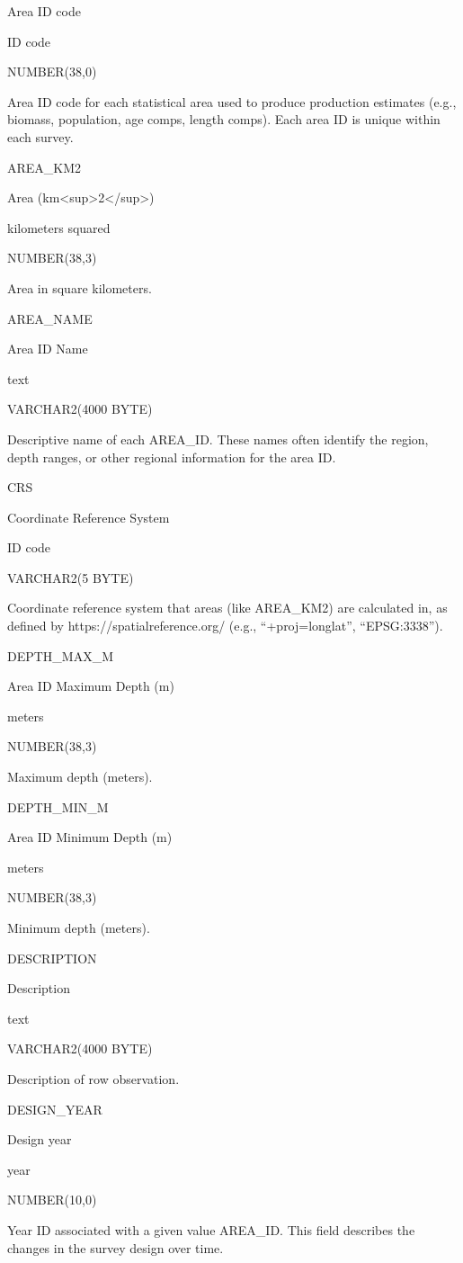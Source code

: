 \documentclass[
  letterpaper,
  oneside,
  open=any]{scrbook}
\begin{document}
Area ID code

ID code

NUMBER(38,0)

Area ID code for each statistical area used to produce production
estimates (e.g., biomass, population, age comps, length comps). Each
area ID is unique within each survey.

AREA\_KM2

Area (km\textless sup\textgreater2\textless/sup\textgreater)

kilometers squared

NUMBER(38,3)

Area in square kilometers.

AREA\_NAME

Area ID Name

text

VARCHAR2(4000 BYTE)

Descriptive name of each AREA\_ID. These names often identify the
region, depth ranges, or other regional information for the area ID.

CRS

Coordinate Reference System

ID code

VARCHAR2(5 BYTE)

Coordinate reference system that areas (like AREA\_KM2) are calculated
in, as defined by https://spatialreference.org/ (e.g.,
``+proj=longlat'', ``EPSG:3338'').

DEPTH\_MAX\_M

Area ID Maximum Depth (m)

meters

NUMBER(38,3)

Maximum depth (meters).

DEPTH\_MIN\_M

Area ID Minimum Depth (m)

meters

NUMBER(38,3)

Minimum depth (meters).

DESCRIPTION

Description

text

VARCHAR2(4000 BYTE)

Description of row observation.

DESIGN\_YEAR

Design year

year

NUMBER(10,0)

Year ID associated with a given value AREA\_ID. This field describes the
changes in the survey design over time.
\end{document}

